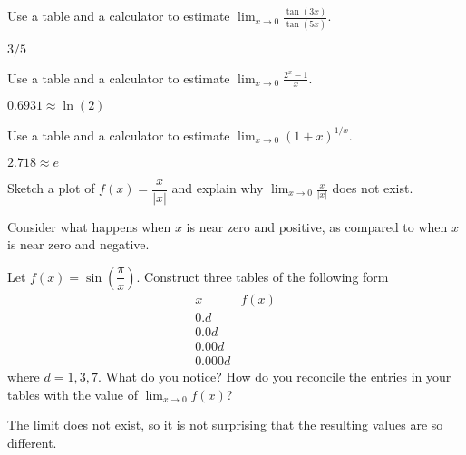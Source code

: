 \begin{exercises}
\begin{exercise} 
Use a table and a calculator to estimate $\lim_{x\to
  0}\frac{\tan(3x)}{\tan(5x)}$.
\begin{answer}
$3/5$
\end{answer}

\end{exercise}

\begin{exercise} 
Use a table and a calculator to estimate $\lim_{x\to 0}
\frac{2^x-1}{x}$.
\begin{answer}
  $0.6931\approx\ln(2)$
\end{answer}
\end{exercise}

\begin{exercise} 
Use a table and a calculator to estimate $\lim_{x\to 0} (1+x)^{1/x}$. 
\begin{answer}
  $2.718 \approx e$
\end{answer}
\end{exercise}



\begin{exercise} 
Sketch a plot of $f(x) = \dfrac{x}{|x|}$ and explain why $\lim_{x\to
  0} \frac{x}{|x|}$ does not exist.
\begin{answer}
  Consider what happens when $x$ is near zero and positive, as compared to when $x$ is near zero and negative.
\end{answer}
\end{exercise}



\begin{exercise} 
Let $f(x) = \sin\left(\dfrac{\pi}{x}\right)$. Construct three tables
of the following form
\[
\begin{array}{l|l}
 x & f(x) \\ \hline
 0.d &   \\
 0.0d &  \\
 0.00d &   \\
 0.000d &  
\end{array}
\]
where $d = 1,3,7$. What do you notice? How do you reconcile the
entries in your tables with the value of $\lim_{x\to 0} f(x)$?
\begin{answer}
  The limit does not exist, so it is not surprising that the resulting values are so different.
\end{answer}
\end{exercise}



\end{exercises}

